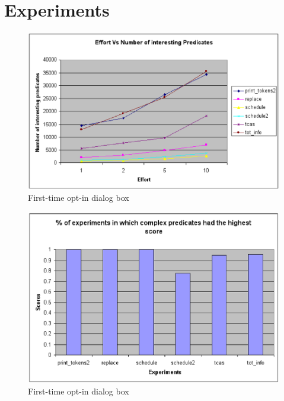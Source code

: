 \section{Experiments}
\label{sec-quant}
\begin{figure}
  \centering
  \includegraphics[width=\columnwidth]{charts/effort}
  \caption{First-time opt-in dialog box}
  \label{fig-effort}
\end{figure}

\begin{figure}
  \centering
  \includegraphics[width=\columnwidth]{charts/top-pred}
  \caption{First-time opt-in dialog box}
  \label{fig-top-pred}
\end{figure}

